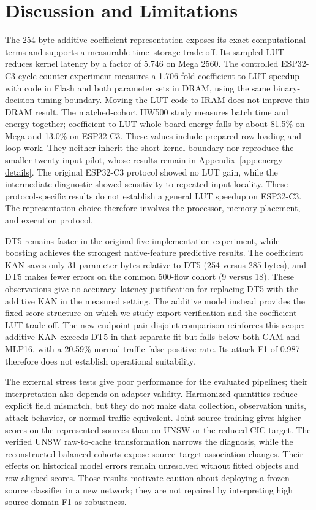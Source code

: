 \documentclass{ieeeaccess}
\begin{document}
\section{Discussion and Limitations}
The 254-byte additive coefficient representation exposes its exact computational terms and supports a measurable time--storage trade-off. Its sampled LUT reduces kernel latency by a factor of 5.746 on Mega 2560. The controlled ESP32-C3 cycle-counter experiment measures a 1.706-fold coefficient-to-LUT speedup with code in Flash and both parameter sets in DRAM, using the same binary-decision timing boundary. Moving the LUT code to IRAM does not improve this DRAM result. The matched-cohort HW500 study measures batch time and energy together; coefficient-to-LUT whole-board energy falls by about 81.5\% on Mega and 13.0\% on ESP32-C3. These values include prepared-row loading and loop work. They neither inherit the short-kernel boundary nor reproduce the smaller twenty-input pilot, whose results remain in Appendix~\ref{app:energy-details}. The original ESP32-C3 protocol showed no LUT gain, while the intermediate diagnostic showed sensitivity to repeated-input locality. These protocol-specific results do not establish a general LUT speedup on ESP32-C3. The representation choice therefore involves the processor, memory placement, and execution protocol.

DT5 remains faster in the original five-implementation experiment, while boosting achieves the strongest native-feature predictive results. The coefficient KAN saves only 31 parameter bytes relative to DT5 (254 versus 285 bytes), and DT5 makes fewer errors on the common 500-flow cohort (9 versus 18). These observations give no accuracy--latency justification for replacing DT5 with the additive KAN in the measured setting. The additive model instead provides the fixed score structure on which we study export verification and the coefficient--LUT trade-off. The new endpoint-pair-disjoint comparison reinforces this scope: additive KAN exceeds DT5 in that separate fit but falls below both GAM and MLP16, with a 20.59\% normal-traffic false-positive rate. Its attack F1 of 0.987 therefore does not establish operational suitability.

The external stress tests give poor performance for the evaluated pipelines; their interpretation also depends on adapter validity. Harmonized quantities reduce explicit field mismatch, but they do not make data collection, observation units, attack behavior, or normal traffic equivalent. Joint-source training gives higher scores on the represented sources than on UNSW or the reduced CIC target. The verified UNSW raw-to-cache transformation narrows the diagnosis, while the reconstructed balanced cohorts expose source--target association changes. Their effects on historical model errors remain unresolved without fitted objects and row-aligned scores. Those results motivate caution about deploying a frozen source classifier in a new network; they are not repaired by interpreting high source-domain F1 as robustness.
\end{document}
